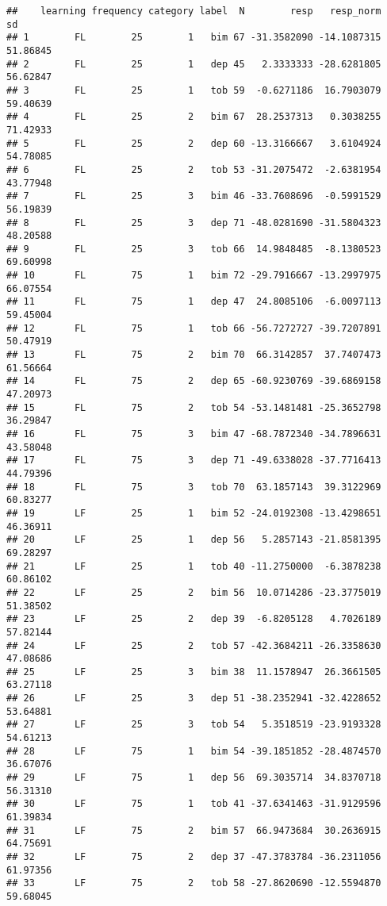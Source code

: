 \documentclass[
]{article}
\begin{document}
\begin{verbatim}
##    learning frequency category label  N        resp   resp_norm       sd
## 1        FL        25        1   bim 67 -31.3582090 -14.1087315 51.86845
## 2        FL        25        1   dep 45   2.3333333 -28.6281805 56.62847
## 3        FL        25        1   tob 59  -0.6271186  16.7903079 59.40639
## 4        FL        25        2   bim 67  28.2537313   0.3038255 71.42933
## 5        FL        25        2   dep 60 -13.3166667   3.6104924 54.78085
## 6        FL        25        2   tob 53 -31.2075472  -2.6381954 43.77948
## 7        FL        25        3   bim 46 -33.7608696  -0.5991529 56.19839
## 8        FL        25        3   dep 71 -48.0281690 -31.5804323 48.20588
## 9        FL        25        3   tob 66  14.9848485  -8.1380523 69.60998
## 10       FL        75        1   bim 72 -29.7916667 -13.2997975 66.07554
## 11       FL        75        1   dep 47  24.8085106  -6.0097113 59.45004
## 12       FL        75        1   tob 66 -56.7272727 -39.7207891 50.47919
## 13       FL        75        2   bim 70  66.3142857  37.7407473 61.56664
## 14       FL        75        2   dep 65 -60.9230769 -39.6869158 47.20973
## 15       FL        75        2   tob 54 -53.1481481 -25.3652798 36.29847
## 16       FL        75        3   bim 47 -68.7872340 -34.7896631 43.58048
## 17       FL        75        3   dep 71 -49.6338028 -37.7716413 44.79396
## 18       FL        75        3   tob 70  63.1857143  39.3122969 60.83277
## 19       LF        25        1   bim 52 -24.0192308 -13.4298651 46.36911
## 20       LF        25        1   dep 56   5.2857143 -21.8581395 69.28297
## 21       LF        25        1   tob 40 -11.2750000  -6.3878238 60.86102
## 22       LF        25        2   bim 56  10.0714286 -23.3775019 51.38502
## 23       LF        25        2   dep 39  -6.8205128   4.7026189 57.82144
## 24       LF        25        2   tob 57 -42.3684211 -26.3358630 47.08686
## 25       LF        25        3   bim 38  11.1578947  26.3661505 63.27118
## 26       LF        25        3   dep 51 -38.2352941 -32.4228652 53.64881
## 27       LF        25        3   tob 54   5.3518519 -23.9193328 54.61213
## 28       LF        75        1   bim 54 -39.1851852 -28.4874570 36.67076
## 29       LF        75        1   dep 56  69.3035714  34.8370718 56.31310
## 30       LF        75        1   tob 41 -37.6341463 -31.9129596 61.39834
## 31       LF        75        2   bim 57  66.9473684  30.2636915 64.75691
## 32       LF        75        2   dep 37 -47.3783784 -36.2311056 61.97356
## 33       LF        75        2   tob 58 -27.8620690 -12.5594870 59.68045

\end{verbatim}
\end{document}
